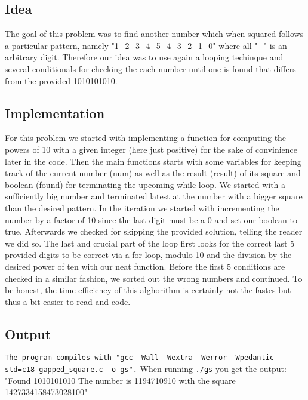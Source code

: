 \documentclass[12pt,a4paper]{article}
\begin{document}
\subsection{Idea}
The goal of this problem was to find another number which when squared follows a particular pattern, namely "1\_2\_3\_4\_5\_4\_3\_2\_1\_0" 
where all "\_" is an arbitrary digit. Therefore our idea was to use again a looping techinque and several conditionals for checking the 
each number until one is found that differs from the provided 1010101010.
\newline

\subsection{Implementation}
For this problem we started with implementing a function for computing the powers of 10 with a given integer (here just positive) for the 
sake of convinience later in the code. Then the main functions starts with some variables for keeping track of the current number (num) as 
well as the result (result) of its square and boolean (found) for terminating the upcoming while-loop. We started with a sufficiently big number and terminated
latest at the number with a bigger square than the desired pattern. In the iteration we started with incrementing the number by a factor of 10 
since the last digit must be a 0 and set our boolean to true. Afterwards we checked for skipping the provided solution, telling the reader we did so.
The last and crucial part of the loop first looks for the correct last 5 provided digits to be correct via a for loop, modulo 10 and the division by the
desired power of ten with our neat function. Before the first 5 conditions are checked in a similar fashion, we sorted out the wrong numbers and continued.
To be honest, the time efficiency of this alghorithm is certainly not the fastes but thus a bit easier to read and code.
\newline

\vspace{1em}

\subsection{Output}
\texttt{The program compiles with "gcc -Wall -Wextra -Werror -Wpedantic -std=c18 gapped\_square.c -o gs".}
When running \texttt{./gs} you get the output: 
\newline
"Found 1010101010 
\newline
The number is 1194710910 with the square 1427334158473028100"
\end{document}
